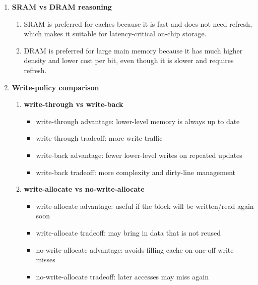 \documentclass[11pt]{article}
\begin{document}
\begin{enumerate}[label=\textbf{B\arabic*.}]
  \item \textbf{SRAM vs DRAM reasoning}
  \begin{enumerate}[label=(\alph*)]
    \item SRAM is preferred for caches because it is fast and does not need refresh, which makes it suitable for latency-critical on-chip storage.
    \item DRAM is preferred for large main memory because it has much higher density and lower cost per bit, even though it is slower and requires refresh.
  \end{enumerate}

  \item \textbf{Write-policy comparison}
  \begin{enumerate}[label=(\alph*)]
    \item \textbf{write-through vs write-back}
    \begin{itemize}[leftmargin=1.5em]
      \item write-through advantage: lower-level memory is always up to date
      \item write-through tradeoff: more write traffic
      \item write-back advantage: fewer lower-level writes on repeated updates
      \item write-back tradeoff: more complexity and dirty-line management
    \end{itemize}
    \item \textbf{write-allocate vs no-write-allocate}
    \begin{itemize}[leftmargin=1.5em]
      \item write-allocate advantage: useful if the block will be written/read again soon
      \item write-allocate tradeoff: may bring in data that is not reused
      \item no-write-allocate advantage: avoids filling cache on one-off write misses
      \item no-write-allocate tradeoff: later accesses may miss again
    \end{itemize}
  \end{enumerate}
\end{enumerate}
\end{document}
